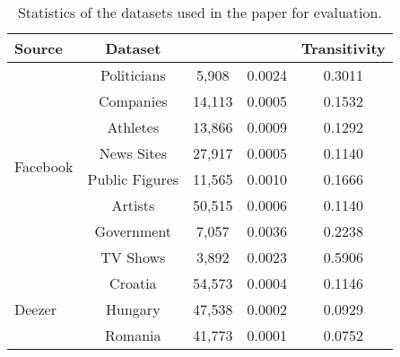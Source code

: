 {\small\begin{table}[H]
\centering
\begin{tabular}{lcccc}
\hline
 \textbf{Source}& \textbf{Dataset}&  &  & \textbf{Transitivity}\\ \hline
\multirow{8}{*}{Facebook} &  Politicians &   5,908  &0.0024 &  0.3011      \\
&  Companies &   14,113  & 0.0005    &     0.1532           \\
&  Athletes &   13,866  & 0.0009  &   0.1292      \\
&  News Sites &   27,917  & 0.0005  &   0.1140       \\
&  Public Figures &   11,565  & 0.0010    & 0.1666           \\
&  Artists &   50,515  &  0.0006   &    0.1140      \\
&  Government &   7,057  & 0.0036    &0.2238          \\
&  TV Shows &   3,892  & 0.0023    & 0.5906        \\\hline
 &Croatia &   54,573  &      0.0004   & 0.1146      \\
Deezer & Hungary &   47,538  & 0.0002    &      0.0929    \\
 & Romania &   41,773 &  0.0001   &       0.0752  \\
 \hline
\end{tabular}
\caption{Statistics of the datasets used in the paper for evaluation.}
\label{fig:stats}
	\vspace{-5mm}
\end{table}}
